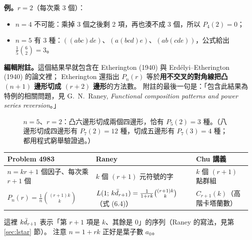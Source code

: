 \textbf{例。}$r=2$（每次乘 3 個）：
\begin{itemize}
  \item $n=4$ 不可能：乘掉 3 個之後剩 2 項，再也湊不成 3 個，所以 $P_4(2)=0$；
  \item $n=5$ 有 3 種：$((abc)de)$、$(a(bcd)e)$、$(ab(cde))$，公式給出 $\frac15\binom{6}{2}=3$。
\end{itemize}

\textbf{編輯附註。}這個結果早就包含在 Etherington (1940) 與 Erdélyi--Etherington (1940) 的論文裡；
Etherington 還指出 $P_n(r)$ 等於\textbf{用不交叉的對角線把凸 $(n+1)$ 邊形切成 $(r+2)$ 邊形}的方法數。
附註的最後一句是：「包含此結果為特例的相關問題，見 G.~N.~Raney, \emph{Functional composition patterns and power series reversion}。」

\begin{figure}[H]
\centering
\RanHexagon
\caption{$n=5$、$r=2$：凸六邊形切成兩個四邊形，恰有 $P_5(2)=3$ 種。（八邊形切成四邊形有 $P_7(2)=12$ 種，切成五邊形有 $P_7(3)=4$ 種；都用程式窮舉驗證過。）}
\label{fig:hexagon}
\end{figure}

\begin{keybox}[同一個數的三種說法]
\begin{center}
\small
\renewcommand{\arraystretch}{1.4}
\begin{tabular}{@{}>{\raggedright}p{4.2cm}>{\raggedright}p{5.4cm}>{\raggedright\arraybackslash}p{4.4cm}@{}}
\toprule
Problem 4983 & Raney & Chu 講義\\
\midrule
$n=kr+1$ 個因子、每次乘 $r+1$ 個 & $k$ 個 $(r+1)$ 元符號的字 & $k$ 個 $(r+1)$ 點群組\\
$P_n(r)=\frac1n\binom{(r+1)k}{k}$ & $L(1;\,k\bar d_{r+1})=\frac{1}{1+rk}\binom{(r+1)k}{k}$（式 (6.4)） & $C_{r+1}(k)$（高階卡塔蘭數）\\
\bottomrule
\end{tabular}
\end{center}
這裡 $k\bar d_{r+1}$ 表示「第 $r+1$ 項是 $k$、其餘是 0」的序列（Raney 的寫法，見第 \ref{sec:lstar} 節）。
注意 $n=1+rk$ 正好是葉子數 $a_0$。
\end{keybox}
